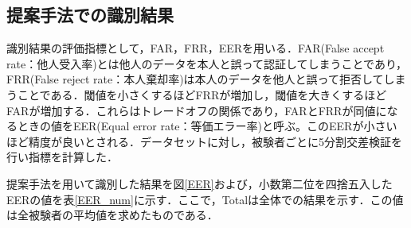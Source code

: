 \documentclass[Japanese]{dicomopapers}
\begin{document}
\subsection{提案手法での識別結果}
識別結果の評価指標として，FAR，FRR，EERを用いる．FAR(False accept rate：他人受入率)とは他人のデータを本人と誤って認証してしまうことであり，FRR(False reject rate：本人棄却率)は本人のデータを他人と誤って拒否してしまうことである．閾値を小さくするほどFRRが増加し，閾値を大きくするほどFARが増加する．これらはトレードオフの関係であり，FARとFRRが同値になるときの値をEER(Equal error rate：等価エラー率)と呼ぶ。このEERが小さいほど精度が良いとされる．データセットに対し，被験者ごとに5分割交差検証を行い指標を計算した．\par
提案手法を用いて識別した結果を図\ref{EER}および，小数第二位を四捨五入したEERの値を表\ref{EER_num}に示す．ここで，Totalは全体での結果を示す．この値は全被験者の平均値を求めたものである．
\end{document}
